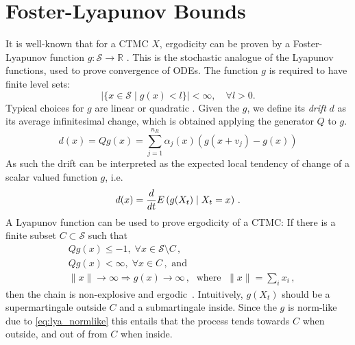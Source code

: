 \section{Foster-Lyapunov Bounds}\label{sec:statagg:lyapunov}
It is well-known that for a \ac{CTMC} $X$, ergodicity can be proven
by a Foster-Lyapunov
function $g:\mathcal{S}\to\mathbb{R}$
\parencite{meyn1993stability,dayar2011bounding}.
This is the stochastic analogue of the Lyapunov functions, used to
prove convergence of \acp{ODE}\@.
The function $g$ is required to have finite level sets:
\[
  \left|\{x\in\mathcal{S} \mid g(x) < l\}\right|<\infty,\quad \forall l > 0.
\]
Typical choices for $g$ are linear
\parencite{gupta2014scalable,milias2014optimization} or quadratic
\parencite{spieler2014numerical}.
Given the $g$, we define its \emph{drift} $d$ as its average
infinitesimal change, which is obtained applying the generator $Q$ to
$g$.%
\begin{equation}\label{eq:drift}
  d(x) = Qg(x) = \sum_{j=1}^{n_R} \alpha_j(x) (g(x+v_j) -  g(x))
\end{equation}
As such the drift can be interpreted as the expected local tendency
of change of a scalar valued function $g$, i.e.\
\[
  d(x) = \frac{d}{dt}{E}\left(g(X_t)\mid X_t = x\right)\,.
\]
A Lyapunov function can be used to prove ergodicity of a \ac{CTMC}:
If there is a finite subset $C\subset\mathcal{S}$ such that
\begin{align}
  &Qg(x)\leq -1,\; \forall x\in\mathcal{S}\setminus C\,,\label{eq:neg_outside}\\
  &Qg(x)< \infty,\; \forall x\in C\,, \text{ and}\label{eq:pos_inside}\\
  &\lVert x\rVert\to\infty \Rightarrow g(x)\to\infty\,,\;\text{ where
  }\;\lVert x\rVert=\sum_i x_i\,,\label{eq:lya_normlike}
\end{align}
then the chain is non-explosive and
ergodic~\parencite{milias2014optimization,tweedie_1975}.
Intuitively, $g(X_t)$ should be a supermartingale outside $C$ and a
submartingale inside.
Since the $g$ is norm-like due to \eqref{eq:lya_normlike} this
entails that the process
tends towards $C$ when outside, and out of from $C$ when inside.

